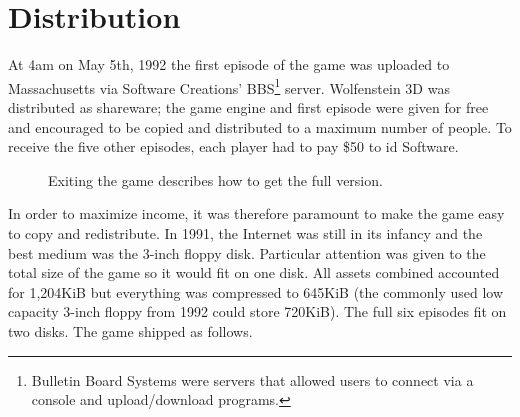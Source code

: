 \documentclass[book.tex]{subfiles}
\begin{document}
\section{Distribution}
At 4am on May 5th, 1992 the first episode of the game was uploaded to Massachusetts via Software Creations' BBS\footnote{Bulletin Board Systems were servers that allowed users to connect via a console and upload/download programs.} server. Wolfenstein 3D was distributed as shareware; the game engine and first episode were given for free and encouraged to be copied and distributed to a maximum number of people. To receive the five other episodes, each player had to pay \$50 to id Software.\\
\par
\vspace{-10pt}
\begin{figure}[H]
\centering
 \caption{Exiting the game describes how to get the full version.}
 \end{figure}


\par
In order to maximize income, it was therefore paramount to make the game easy to copy and redistribute. In 1991, the Internet was still in its infancy and the best medium was the 3-inch floppy disk. Particular attention was given to the total size of the game so it would fit on one disk. All assets combined accounted for 1,204KiB but everything was compressed to 645KiB (the commonly used low capacity 3-inch floppy from 1992 could store 720KiB). The full six episodes fit on two disks.
The game shipped as follows.\\
\end{document}
